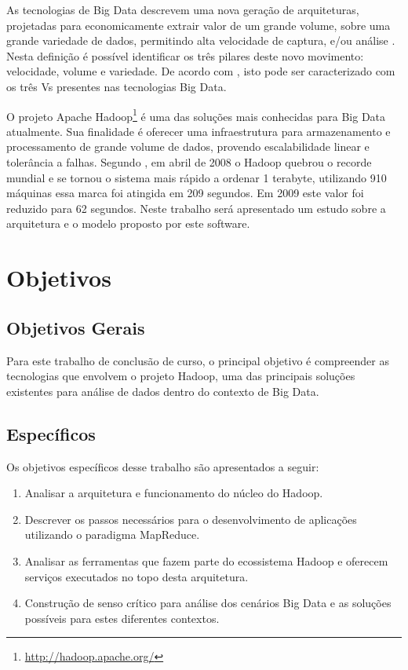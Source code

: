 As tecnologias de Big Data descrevem uma nova geração de arquiteturas, projetadas para economicamente extrair valor de um grande volume, sobre uma grande variedade de dados, permitindo alta velocidade de captura, e/ou análise \cite{gantz2011}. Nesta definição é possível identificar os três pilares deste novo movimento: velocidade, volume e variedade. De acordo com , isto pode ser caracterizado com os três Vs presentes nas tecnologias Big Data.

O projeto Apache Hadoop\footnote{\url{http://hadoop.apache.org/}} é uma das soluções mais conhecidas para Big Data atualmente. Sua finalidade é oferecer uma infraestrutura para armazenamento e processamento de grande volume de dados, provendo escalabilidade linear e tolerância a falhas. Segundo , em abril de 2008 o Hadoop quebrou o recorde mundial e se tornou o sistema mais rápido a ordenar 1 terabyte, utilizando 910 máquinas essa marca foi atingida em 209 segundos. Em 2009 este valor foi reduzido para 62 segundos. Neste trabalho será apresentado um estudo sobre a arquitetura e o modelo proposto por este software.

 
\section{Objetivos}

\subsection{Objetivos Gerais}
 
Para este trabalho de conclusão de curso, o principal objetivo é compreender as tecnologias que envolvem o projeto Hadoop, uma das principais soluções existentes para análise de dados dentro do contexto de Big Data.
 
 
 
\subsection{Específicos}
 
Os objetivos específicos desse trabalho são apresentados a seguir:
 
\begin{enumerate}
  \item Analisar a arquitetura e funcionamento do núcleo do Hadoop.
  \item Descrever os passos necessários para o desenvolvimento de aplicações utilizando o paradigma MapReduce.
  \item Analisar as ferramentas que fazem parte do ecossistema Hadoop e oferecem serviços executados no topo desta arquitetura.
  \item Construção de senso crítico para análise dos cenários Big Data e as soluções possíveis para estes diferentes contextos.
\end{enumerate}
 
